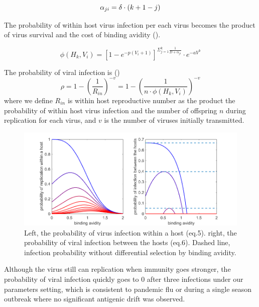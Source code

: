 \documentclass{article}
\begin{document}
\begin{equation}
 \alpha_{ji} = \delta\cdot (k+1-j) \\
\end{equation}

The probability of within host virus infection per each virus becomes the product of virus survival and the cost of binding avidity (\citep{Yuan2013}). 

\begin{equation}
  \phi(H_{k},V_{i}) = [1-e^{-p(V_{i}+1)}]^{\Sigma_{j=1}^{k}\frac{1}{D+\alpha_{ji}}} \cdot e^{-aV^{b}}
\end{equation} 


The probability of viral infection is (\citep{Keeling2008})
\begin{equation}
\rho=1-(\frac{1}{R_{in}})^{-v}
=1-(\frac{1}{n \cdot \phi(H_{k},V_{i})})^{-v}
\end{equation}
where we define $R_{in}$ is within host reproductive number as the product the probability of within host virus infection and the number of offspring $n$ during replication for each virus, and $v$ is the number of viruses initially transmitted.   
 
\begin{figure}[h!]
        \includegraphics[width=1.2\textwidth,natwidth=8,natheight=10]{figure1.png}
        \caption{Left, the probability of virus infection within a host (eq.5). right, the probability of viral infection between the hosts (eq.6). Dashed line, infection probability without differential selection by binding avidity. }
\end{figure}

Although the virus still can replication when immunity goes stronger, the probability of viral infection quickly goes to 0 after three infections under our parameters setting, which is consistent to pandemic flu or during a single season outbreak where no significant antigenic drift was observed.
 
\end{document}
